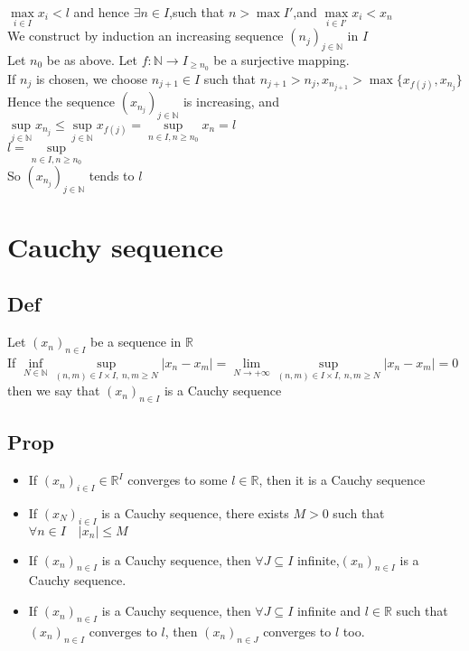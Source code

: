 \documentclass{book}
\begin{document}
$\max\limits_{i\in I}x_i<l$ and hence $\exists n\in I$,such that $n>\max I'$,and $\max\limits_{i\in I'}x_i<x_n$\\
We construct by induction an increasing sequence $(n_j)_{j\in \mathbb{N} }$ in $I$\\\indent 
Let $n_0$ be as above. Let $f:\mathbb{N} \rightarrow I_{\geq n_0}$ be a surjective mapping.\\\indent 
If $n_j$ is chosen, we choose $n_{j+1}\in I$ such that $n_{j+1}>n_j, x_{n_{j+1}}>\max\{x_{f(j)},x_{n_j}\}$ Hence the sequence $(x_{n_j})_{j\in \mathbb{N} }$ is increasing, and $\sup\limits_{j\in \mathbb{N} }x_{n_j}\leq\sup\limits_{j\in\mathbb{N} }x_{f(j)}=\sup\limits_{n\in I,n\geq n_0}x_n=l$\\\indent 
$l=\sup\limits_{n\in I,n\geq n_0}$\\\indent 
So $(x_{n_j})_{j\in\mathbb{N} }$ tends to $l$
\chapter{Cauchy sequence}
\section{Def}
Let $(x_n)_{n\in I}$ be a sequence in $\mathbb{R} $\\
If $\inf\limits_{N\in \mathbb{N} }\sup\limits_{(n,m)\in I\times I,\ n,m\geq N}\lvert x_n-x_m\rvert=\lim\limits_{N\rightarrow+\infty}\sup\limits_{(n,m)\in I\times I,\ n,m\geq N}\lvert x_n-x_m\rvert=0$ then we say that $(x_n)_{n\in I}$ is a Cauchy sequence
\section{Prop}
\begin{itemize}
    \item If $(x_n)_{i\in I}\in \mathbb{R} ^I$ converges to some $l\in \mathbb{R} $, then it is a Cauchy sequence
    \item If $(x_N)_{i\in I}$ is a Cauchy sequence, there exists $M>0$ such that $ \forall n\in I\quad \lvert x_n\rvert\leq M$
    \item If $(x_n)_{n\in I}$ is a Cauchy sequence, then $\forall J\subseteq I$ infinite,$(x_n)_{n\in I}$ is a Cauchy sequence.
    \item If $(x_n)_{n\in I}$ is a Cauchy sequence, then $\forall J\subseteq I$ infinite and $l\in \mathbb{R} $ such that $(x_n)_{n\in I}$ converges to $l$, then $(x_n)_{n\in J}$ converges to $l$ too.
\end{itemize}
\end{document}
